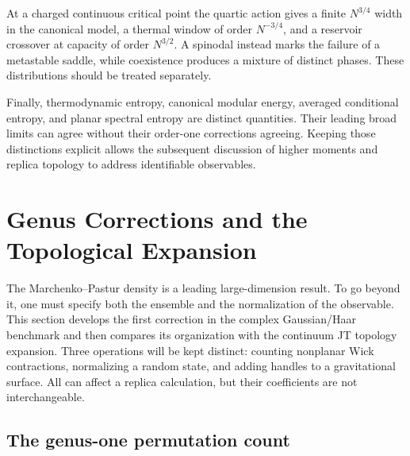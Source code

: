 \documentclass[11pt,letterpaper]{article}
\theoremstyle{plain}
\theoremstyle{definition}
\theoremstyle{remark}
\begin{document}
At a charged continuous critical point the quartic action gives a finite
$N^{3/4}$ width in the canonical model, a thermal window of order $N^{-3/4}$,
and a reservoir crossover at capacity of order $N^{3/2}$. A spinodal instead
marks the failure of a metastable saddle, while coexistence produces a
mixture of distinct phases. These distributions should be treated separately.

Finally, thermodynamic entropy, canonical modular energy, averaged
conditional entropy, and planar spectral entropy are distinct quantities.
Their leading broad limits can agree without their order-one corrections
agreeing. Keeping those distinctions explicit allows the subsequent discussion
of higher moments and replica topology to address identifiable observables.

\section{Genus Corrections and the Topological Expansion}
\label{sec10:genus_corrections}

The Marchenko--Pastur density is a leading large-dimension result.  To go
beyond it, one must specify both the ensemble and the normalization of the
observable.  This section develops the first correction in the complex
Gaussian/Haar benchmark and then compares its organization with the
continuum JT topology expansion.  Three operations will be kept distinct:
counting nonplanar Wick contractions, normalizing a random state, and adding
handles to a gravitational surface.  All can affect a replica calculation,
but their coefficients are not interchangeable.

\subsection{The genus-one permutation count}
\label{subsec10:genus_one}
\end{document}

